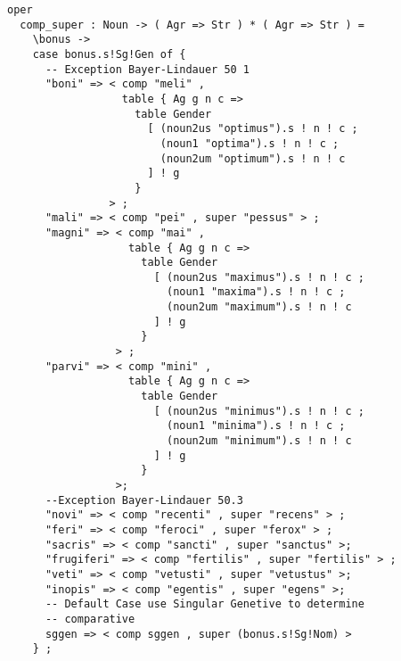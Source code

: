 \begin{lstlisting}[float=h!tp,caption={Funktion zur Bestimmung der Komparativ- und Superlativformen eines Adjektivs (vgl. \textbf{MorphoLat.gf})},label={GF-Morpho-CompSuper},basicstyle=\small]
oper
  comp_super : Noun -> ( Agr => Str ) * ( Agr => Str ) = 
    \bonus ->
    case bonus.s!Sg!Gen of {
      -- Exception Bayer-Lindauer 50 1
      "boni" => < comp "meli" , 
                  table { Ag g n c => 
                    table Gender 
                      [ (noun2us "optimus").s ! n ! c ; 
                        (noun1 "optima").s ! n ! c ; 
                        (noun2um "optimum").s ! n ! c 
                      ] ! g 
                    } 
                > ;
      "mali" => < comp "pei" , super "pessus" > ;
      "magni" => < comp "mai" , 
                   table { Ag g n c => 
                     table Gender 
                       [ (noun2us "maximus").s ! n ! c ; 
                         (noun1 "maxima").s ! n ! c ; 
                         (noun2um "maximum").s ! n ! c 
                       ] ! g 
                     } 
                 > ;
      "parvi" => < comp "mini" , 
                   table { Ag g n c => 
                     table Gender 
                       [ (noun2us "minimus").s ! n ! c ; 
                         (noun1 "minima").s ! n ! c ; 
                         (noun2um "minimum").s ! n ! c 
                       ] ! g 
                     } 
                 >;
      --Exception Bayer-Lindauer 50.3
      "novi" => < comp "recenti" , super "recens" > ;
      "feri" => < comp "feroci" , super "ferox" > ;
      "sacris" => < comp "sancti" , super "sanctus" >;
      "frugiferi" => < comp "fertilis" , super "fertilis" > ;
      "veti" => < comp "vetusti" , super "vetustus" >;
      "inopis" => < comp "egentis" , super "egens" >;
      -- Default Case use Singular Genetive to determine 
      -- comparative
      sggen => < comp sggen , super (bonus.s!Sg!Nom) >
    } ;
\end{lstlisting}
